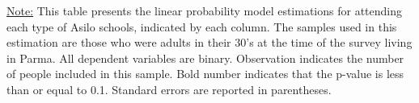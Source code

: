 \begin{scriptsize}
\noindent\underline{Note:} This table presents the linear probability model estimations for attending each type of Asilo schools, indicated by each column. The samples used in this estimation are those who were adults in their 30's at the time of the survey living in Parma. All dependent variables are binary. Observation indicates the number of people included in this sample. Bold number indicates that the p-value is less than or equal to 0.1. Standard errors are reported in parentheses.
\end{scriptsize}
